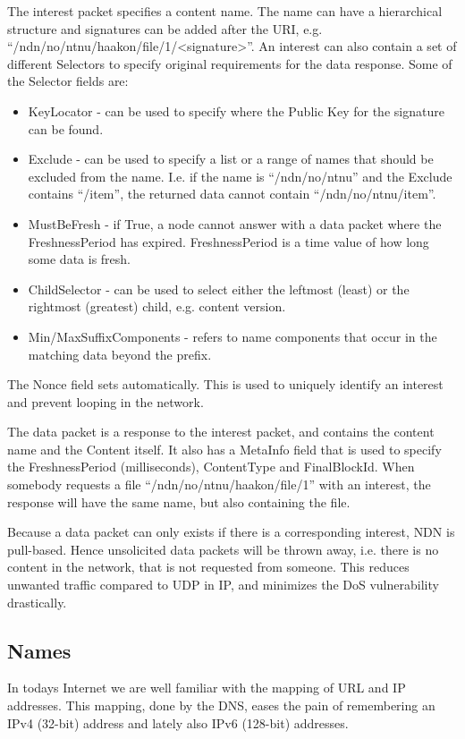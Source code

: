 The \gls{interest} packet specifies a content \gls{name}. 
The \gls{name} can have a hierarchical structure and signatures can be added after the \gls{URI}, e.g. ``/ndn/no/ntnu/haakon/file/1/<signature>''.
An \gls{interest} can also contain a set of different Selectors to specify original requirements for the \gls{data} response. 
Some of the Selector fields are:
\begin{itemize}
  \item KeyLocator - can be used to specify where the Public Key for the signature can be found.
  \item Exclude - can be used to specify a list or a range of names that should be excluded from the \gls{name}. 
  I.e. if the \gls{name} is ``/ndn/no/ntnu'' and the Exclude contains ``/item'', the returned \gls{data} cannot contain ``/ndn/no/ntnu/item''.
  \item MustBeFresh - if True, a \gls{node} cannot answer with a \gls{data} packet where the FreshnessPeriod has expired.
  FreshnessPeriod is a time value of how long some \gls{data} is fresh.
  \item ChildSelector - can be used to select either the leftmost (least) or the rightmost (greatest) child, e.g. content version. 
  \item Min/MaxSuffixComponents - refers to \gls{name} components that occur in the matching \gls{data} beyond the prefix. 
\end{itemize}
The Nonce field sets automatically. 
This is used to uniquely identify an \gls{interest} and prevent looping in the network.

The \gls{data} packet is a response to the \gls{interest} packet, and contains the content \gls{name} and the Content itself.
It also has a MetaInfo field that is used to specify the FreshnessPeriod (milliseconds), ContentType and FinalBlockId. 
When somebody requests a file ``/ndn/no/ntnu/haakon/file/1'' with an \gls{interest}, the response will have the same \gls{name}, but also containing the file.

Because a \gls{data} packet can only exists if there is a corresponding \gls{interest}, \gls{NDN} is pull-based.
Hence unsolicited \gls{data} packets will be thrown away, i.e. there is no content in the network, that is not requested from someone.
This reduces unwanted traffic compared to \gls{UDP} in \gls{IP}, and minimizes the \gls{DoS} vulnerability drastically.

\subsection{Names}\label{name}
In todays Internet we are well familiar with the mapping of \gls{URL} and \gls{IP} addresses.
This mapping, done by the \gls{DNS}, eases the pain of remembering an \gls{IPv4} (32-bit) address and lately also \gls{IPv6} (128-bit) addresses.

